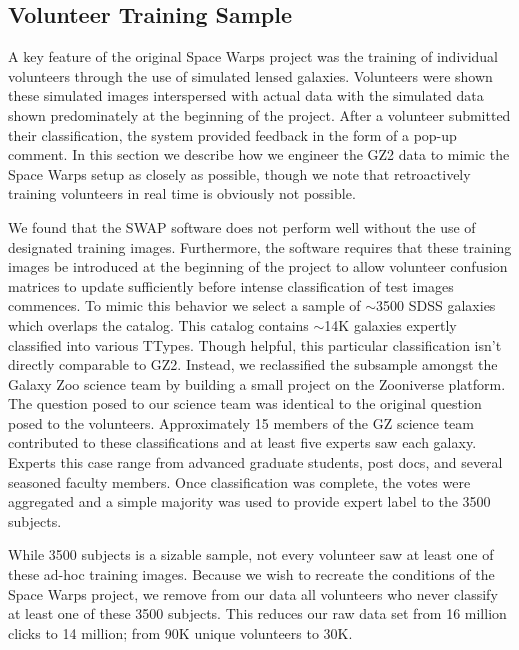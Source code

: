\documentclass[twocolumn]{aastex6}
\begin{document}
\subsection{Volunteer Training Sample}\label{sec: training sample}

A key feature of the original Space Warps project was the training of 
individual volunteers through the use of simulated lensed galaxies. Volunteers were 
shown these simulated images interspersed with actual data with the simulated data shown
predominately at the beginning of the project. After a volunteer submitted their 
classification, the system provided feedback in the form of a pop-up comment. 
In this section we describe how we engineer the GZ2 data to mimic the Space 
Warps setup as closely as possible, though we note that retroactively training 
volunteers in real time is obviously not possible. 

We found that the SWAP software does not perform well without the use of designated 
training images. Furthermore, the software requires that these training images
be introduced at the beginning of the project to allow volunteer confusion matrices
to update sufficiently before intense classification of test images commences. 
To mimic this behavior we select a sample of $\sim$3500 SDSS galaxies which 
overlaps the \cite{NairAbraham2010} catalog. This catalog contains $\sim$14K 
galaxies expertly classified into various TTypes. Though helpful, this particular
classification isn't directly comparable to GZ2.   Instead, we reclassified the subsample 
amongst the Galaxy Zoo science team by building a small project on the Zooniverse
platform. The question posed to our science team was identical to the original 
question posed to the volunteers. Approximately 15 members of the GZ science team
contributed to these classifications and at least five experts saw each galaxy. Experts 
this case range from advanced graduate students, post docs, and several 
seasoned faculty members. Once
classification was complete, the votes were aggregated and a simple majority was 
used to provide expert label  to the 3500 subjects. 

While 3500 subjects is a sizable sample, not  every volunteer saw at least 
one of these ad-hoc training images. Because we wish to recreate the conditions 
of the Space Warps project, we remove from our data all volunteers who never 
classify at least one of these 3500 subjects. This reduces our raw data set from
16 million clicks to 14 million; from 90K unique volunteers to 30K. 
\end{document}
